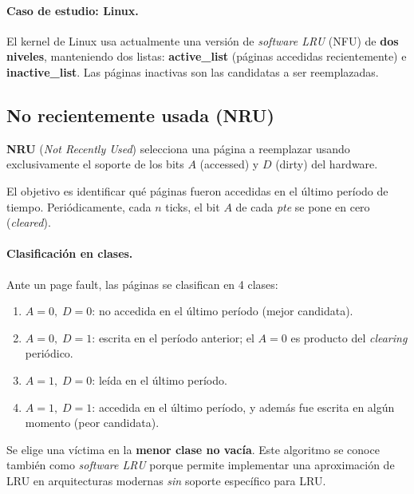 \documentclass[11pt,a4paper]{article}
\begin{document}
\paragraph{Caso de estudio: Linux.}
El kernel de Linux usa actualmente una versión de \emph{software LRU}
(NFU) de \textbf{dos niveles}, manteniendo dos listas:
\textbf{active\_list} (páginas accedidas recientemente) e
\textbf{inactive\_list}. Las páginas inactivas son las candidatas a ser
reemplazadas.

\subsection{No recientemente usada (NRU)}

\textbf{NRU} (\emph{Not Recently Used}) selecciona una página a
reemplazar usando exclusivamente el soporte de los bits $A$ (accessed)
y $D$ (dirty) del hardware.

El objetivo es identificar qué páginas fueron accedidas en el último
período de tiempo. Periódicamente, cada $n$ ticks, el bit $A$ de cada
\emph{pte} se pone en cero (\emph{cleared}).

\paragraph{Clasificación en clases.}
Ante un page fault, las páginas se clasifican en 4 clases:

\begin{enumerate}[leftmargin=*]
    \item $A=0,\;D=0$: no accedida en el último período (mejor
        candidata).
    \item $A=0,\;D=1$: escrita en el período anterior; el $A=0$ es
        producto del \emph{clearing} periódico.
    \item $A=1,\;D=0$: leída en el último período.
    \item $A=1,\;D=1$: accedida en el último período, y además fue
        escrita en algún momento (peor candidata).
\end{enumerate}

Se elige una víctima en la \textbf{menor clase no vacía}. Este algoritmo
se conoce también como \emph{software LRU} porque permite implementar
una aproximación de LRU en arquitecturas modernas \emph{sin} soporte
específico para LRU.

\end{document}
